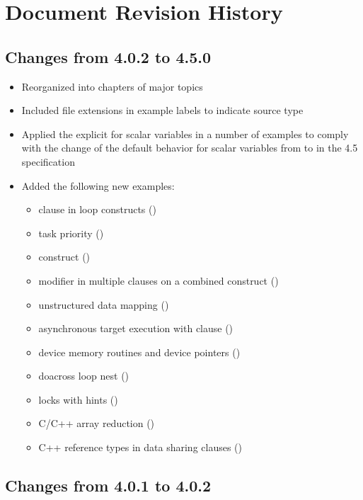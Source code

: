 \chapter{Document Revision History}
\label{chap:history}

\section{Changes from 4.0.2 to 4.5.0}
\begin{itemize}
\item Reorganized into chapters of major topics
\item Included file extensions in example labels to indicate source type
\item Applied the explicit  for scalar variables 
in a number of examples to comply with 
the change of the default behavior for scalar variables from 
 to  in the 4.5 specification
\item Added the following new examples:
\begin{itemize}
\item {} clause in loop constructs ()
\item task priority ()
\item {} construct ()
\item {} modifier in multiple  clauses on
a combined construct ()
\item unstructured data mapping ()
\item asynchronous target execution with  clause ()
\item device memory routines and device pointers
()
\item doacross loop nest ()
\item locks with hints ()
\item C/C++ array reduction ()
\item C++ reference types in data sharing clauses ()
\end{itemize}
\end{itemize}

\section{Changes from 4.0.1 to 4.0.2}

